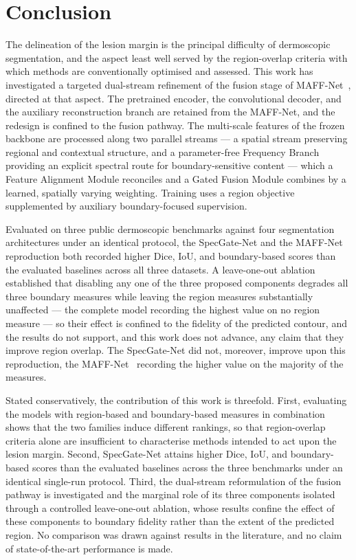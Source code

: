 \section{Conclusion}
\label{sec:conclusion}

The delineation of the lesion margin is the principal difficulty of dermoscopic segmentation, and the aspect least well served by the region-overlap criteria with which methods are conventionally optimised and assessed. This work has investigated a targeted dual-stream refinement of the fusion stage of MAFF-Net~\cite{ref15}, directed at that aspect. The pretrained encoder, the convolutional decoder, and the auxiliary reconstruction branch are retained from the MAFF-Net, and the redesign is confined to the fusion pathway. The multi-scale features of the frozen backbone are processed along two parallel streams --- a spatial stream preserving regional and contextual structure, and a parameter-free Frequency Branch providing an explicit spectral route for boundary-sensitive content --- which a Feature Alignment Module reconciles and a Gated Fusion Module combines by a learned, spatially varying weighting. Training uses a region objective supplemented by auxiliary boundary-focused supervision.

Evaluated on three public dermoscopic benchmarks against four segmentation architectures under an identical protocol, the SpecGate-Net and the MAFF-Net~\cite{ref15} reproduction both recorded higher Dice, IoU, and boundary-based scores than the evaluated baselines across all three datasets. A leave-one-out ablation established that disabling any one of the three proposed components degrades all three boundary measures while leaving the region measures substantially unaffected --- the complete model recording the highest value on no region measure --- so their effect is confined to the fidelity of the predicted contour, and the results do not support, and this work does not advance, any claim that they improve region overlap. The SpecGate-Net did not, moreover, improve upon this reproduction, the MAFF-Net~\cite{ref15} recording the higher value on the majority of the measures.

Stated conservatively, the contribution of this work is threefold. First, evaluating the models with region-based and boundary-based measures in combination shows that the two families induce different rankings, so that region-overlap criteria alone are insufficient to characterise methods intended to act upon the lesion margin. Second, SpecGate-Net attains higher Dice, IoU, and boundary-based scores than the evaluated baselines across the three benchmarks under an identical single-run protocol. Third, the dual-stream reformulation of the fusion pathway is investigated and the marginal role of its three components isolated through a controlled leave-one-out ablation, whose results confine the effect of these components to boundary fidelity rather than the extent of the predicted region. No comparison was drawn against results in the literature, and no claim of state-of-the-art performance is made.

